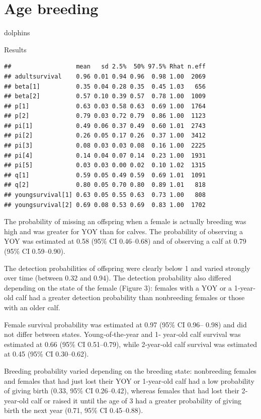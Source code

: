 \documentclass[
  12pt,
]{krantz}
\begin{document}
\section{Age breeding}\label{age-breeding}

dolphins

Results

\begin{verbatim}
##                  mean   sd 2.5%  50% 97.5% Rhat n.eff
## adultsurvival    0.96 0.01 0.94 0.96  0.98 1.00  2069
## beta[1]          0.35 0.04 0.28 0.35  0.45 1.03   656
## beta[2]          0.57 0.10 0.39 0.57  0.78 1.00  1009
## p[1]             0.63 0.03 0.58 0.63  0.69 1.00  1764
## p[2]             0.79 0.03 0.72 0.79  0.86 1.00  1123
## pi[1]            0.49 0.06 0.37 0.49  0.60 1.01  2743
## pi[2]            0.26 0.05 0.17 0.26  0.37 1.00  3412
## pi[3]            0.08 0.03 0.03 0.08  0.16 1.00  2225
## pi[4]            0.14 0.04 0.07 0.14  0.23 1.00  1931
## pi[5]            0.03 0.03 0.00 0.02  0.10 1.02  1315
## q[1]             0.59 0.05 0.49 0.59  0.69 1.01  1091
## q[2]             0.80 0.05 0.70 0.80  0.89 1.01   818
## youngsurvival[1] 0.63 0.05 0.55 0.63  0.73 1.00   808
## youngsurvival[2] 0.69 0.08 0.53 0.69  0.83 1.00  1702
\end{verbatim}

The probability of missing an offspring when a female is actually breeding was high and was greater for YOY than for calves. The probability of observing a YOY was estimated at 0.58 (95\% CI 0.46--0.68) and of observing a calf at 0.79 (95\% CI 0.59--0.90).

The detection probabilities of offspring were clearly below 1 and varied strongly over time (between 0.32 and 0.94). The detection probability also differed depending on the state of the female (Figure 3): females with a YOY or a 1‐year‐old calf had a greater detection probability than nonbreeding females or those with an older calf.

Female survival probability was estimated at 0.97 (95\% CI 0.96-- 0.98) and did not differ between states. Young‐of‐the‐year and 1‐ year‐old calf survival was estimated at 0.66 (95\% CI 0.51--0.79), while 2‐year‐old calf survival was estimated at 0.45 (95\% CI 0.30--0.62).

Breeding probability varied depending on the breeding state: nonbreeding females and females that had just lost their YOY or 1‐year‐old calf had a low probability of giving birth (0.33, 95\% CI 0.26--0.42), whereas females that had lost their 2‐year‐old calf or raised it until the age of 3 had a greater probability of giving birth the next year (0.71, 95\% CI 0.45--0.88).
\end{document}
